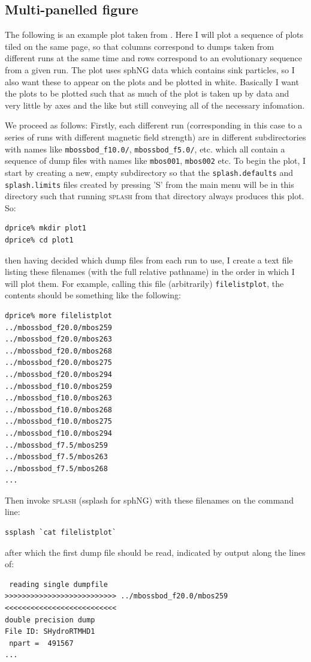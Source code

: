\documentclass[a4paper,10pt]{article}
\newcommand{\splash}{\textsc{splash }}
\begin{document}
\subsection{Multi-panelled figure}
 The following is an example plot taken from \citet{pb07}. Here I will plot a sequence of plots tiled on the same page, so that columns correspond to dumps taken from different runs at the same time and rows correspond to an evolutionary sequence from a given run. The plot uses sphNG data which contains sink particles, so I also want these to appear on the plots and be plotted in white. Basically I want the plots to be plotted such that as much of the plot is taken up by data and very little by axes and the like but still conveying all of the necessary infomation.
 
 We proceed as follows: Firstly, each different run (corresponding in this case to a series of runs with different magnetic field strength) are in different subdirectories with names like \verb+mbossbod_f10.0/+, \verb+mbossbod_f5.0/+, etc. which all contain a sequence of dump files with names like \verb+mbos001+, \verb+mbos002+ etc. To begin the plot, I start by creating a new, empty subdirectory so that the \verb+splash.defaults+ and \verb+splash.limits+ files created by pressing 'S' from the main menu will be in this directory such that running \splash from that directory always produces this plot. So:
\begin{verbatim}
dprice% mkdir plot1
dprice% cd plot1
\end{verbatim}
then having decided which dump files from each run to use, I create a text file listing these filenames (with the full relative pathname) in the order in which I will plot them. For example, calling this file (arbitrarily) \verb+filelistplot+, the contents should be something like the following:
\begin{verbatim}
dprice% more filelistplot 
../mbossbod_f20.0/mbos259
../mbossbod_f20.0/mbos263
../mbossbod_f20.0/mbos268
../mbossbod_f20.0/mbos275
../mbossbod_f20.0/mbos294
../mbossbod_f10.0/mbos259
../mbossbod_f10.0/mbos263
../mbossbod_f10.0/mbos268
../mbossbod_f10.0/mbos275
../mbossbod_f10.0/mbos294
../mbossbod_f7.5/mbos259
../mbossbod_f7.5/mbos263
../mbossbod_f7.5/mbos268
...
\end{verbatim}
 Then invoke \splash (ssplash for sphNG) with these filenames on the command line:
\begin{verbatim}
ssplash `cat filelistplot`
\end{verbatim}
after which the first dump file should be read, indicated by output along the lines of:
\begin{verbatim}
 reading single dumpfile
>>>>>>>>>>>>>>>>>>>>>>>>>> ../mbossbod_f20.0/mbos259 <<<<<<<<<<<<<<<<<<<<<<<<<<
double precision dump
File ID: SHydroRTMHD1
 npart =  491567
...
\end{verbatim}
\end{document}

